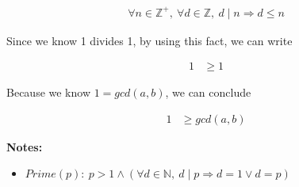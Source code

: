 \documentclass[12pt]{article}
\begin{document}
\begin{enumerate}[a.]
\begin{mdframed}
\begin{enumerate}[1.]
\begin{mdframed}
            \begin{align}
                \forall n \in \mathbb{Z}^{+},\:\forall d \in \mathbb{Z},\:d \mid n \Rightarrow d \leq n
            \end{align}

            Since we know 1 divides 1, by using this fact, we can write

            \begin{align}
                1 &\geq 1
            \end{align}

            Because we know $1 = gcd(a,b)$, we can conclude

            \begin{align}
                1 &\geq gcd(a,b)
            \end{align}

            \end{mdframed}

        \end{enumerate}

    \end{mdframed}

    \bigskip

    \textbf{Notes:}

    \begin{itemize}
        \item $Prime(p):\:p > 1 \land (\forall d \in \mathbb{N},\:d \mid p \Rightarrow d = 1 \lor d = p)$
    \end{itemize}
\end{enumerate}
\end{document}

